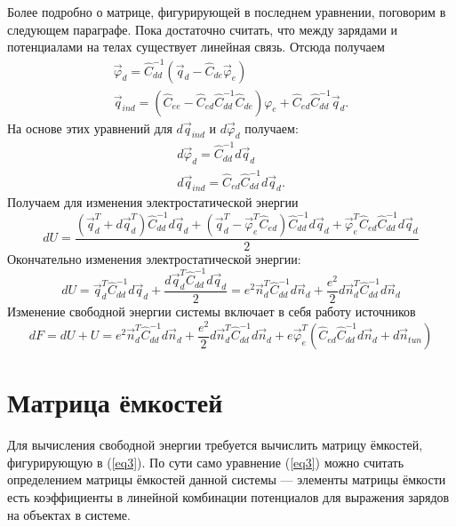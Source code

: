 \documentclass[12pt,a4paper]{report}
\begin{document}
Более подробно о матрице, фигурирующей в последнем уравнении, поговорим в следующем параграфе. Пока достаточно считать, что между зарядами и потенциалами на телах существует линейная связь. Отсюда получаем
\begin{equation}
  \begin{array}{l}
   \vec \varphi_d=\hat C^{-1}_{dd}
   (\vec{q}_d-\hat C_{de}\vec \varphi_e)\\
   \vec q_{ind}=(\hat C_{ee}-\hat C_{ed}\hat C^{-1}_{dd}\hat C_{de})\varphi_e+
   \hat C_{ed}\hat C^{-1}_{dd}\vec q_d.
  \end{array}
\end{equation}
На основе этих уравнений для $d\vec q_{ind}$ и 
$d\vec{\varphi}_d$ получаем:
\begin{equation}
  \begin{array}{l}
   d\vec \varphi_d=\hat C^{-1}_{dd}d\vec{q}_d\\
   d\vec q_{ind}=
   \hat C_{ed}\hat C^{-1}_{dd}d\vec q_d.
  \end{array}
\end{equation}
Получаем для изменения электростатической энергии
\begin{equation}
  dU = 
  \frac{(\vec{q}^T_d+d\vec{q}^T_d)\hat C^{-1}_{dd}d\vec{q}_d+
  (\vec{q}_d^T-\vec \varphi_e^T\hat C_{ed})\hat C^{-1}_{dd}d\vec{q}_d+
  \vec{\varphi}_e^T\hat C_{ed}\hat C^{-1}_{dd}d\vec q_d}{2}
\end{equation}
Окончательно изменения электростатической энергии:
\begin{equation}
  dU = \vec{q}^T_d\hat C^{-1}_{dd}d\vec{q}_d+
  \frac{d\vec{q}^T_d\hat C^{-1}_{dd}d\vec{q}_d}{2}=
  e^2\vec{n}^T_d\hat C^{-1}_{dd}d\vec{n}_d+
  \frac{e^2}{2}d\vec{n}^T_d\hat C^{-1}_{dd}d\vec{n}_d
\end{equation}
Изменение свободной энергии системы включает в себя работу источников
\begin{equation}\label{eq1}
 dF=dU + U=e^2\vec{n}^T_d\hat C^{-1}_{dd}d\vec{n}_d+
  \frac{e^2}{2}d\vec{n}^T_d\hat C^{-1}_{dd}d\vec{n}_d+
  e\vec \varphi_e^T(\hat C_{ed}\hat C^{-1}_{dd}d\vec{n}_d+d\vec{n}_{tun})
\end{equation}
\section{Матрица ёмкостей}
Для вычисления свободной энергии требуется вычислить матрицу ёмкостей, фигурирующую в (\ref{eq3}). По сути само уравнение (\ref{eq3}) можно считать определением матрицы ёмкостей данной системы — элементы матрицы ёмкости есть коэффициенты в линейной комбинации потенциалов для выражения зарядов на объектах в системе.
\end{document}
